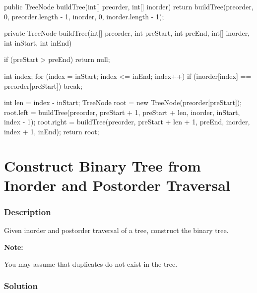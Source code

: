 \begin{Code}
public TreeNode buildTree(int[] preorder, int[] inorder) {
    return buildTree(preorder, 0, preorder.length - 1, inorder, 0, inorder.length - 1);
}

private TreeNode buildTree(int[] preorder, int preStart, int preEnd, int[] inorder, int inStart,
    int inEnd) {
    if (preStart > preEnd) {
        return null;
    }

    int index;
    for (index = inStart; index <= inEnd; index++) {
        if (inorder[index] == preorder[preStart]) {
            break;
        }
    }

    int len = index - inStart;
    TreeNode root = new TreeNode(preorder[preStart]);
    root.left = buildTree(preorder, preStart + 1, preStart + len, inorder, inStart, index - 1);
    root.right = buildTree(preorder, preStart + len + 1, preEnd, inorder, index + 1, inEnd);
    return root;
}
\end{Code}

\newpage

\section{Construct Binary Tree from Inorder and Postorder Traversal} %

\subsubsection{Description}
Given inorder and postorder traversal of a tree, construct the binary tree.

\textbf{Note:}

You may assume that duplicates do not exist in the tree.

\subsubsection{Solution}

